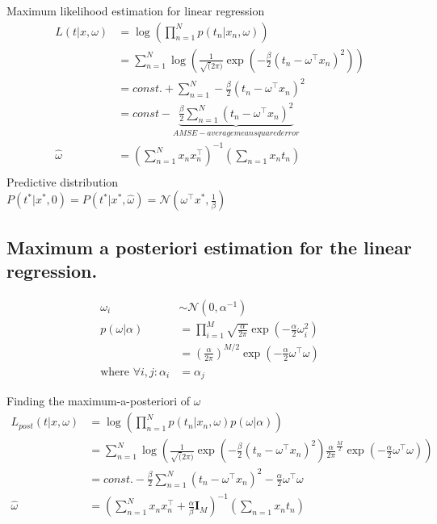 \begin{bbbox}{Maximum likelihood estimation for linear regression}
	\begin{align*}
			L(t | x,\omega) &= \log \left( \prod_{n=1}^N p(t_n |  x_n, \omega ) \right) \\
			        &= \sum_{n=1}^N \log \left( \frac{1}{\sqrt(2\pi)} \exp \left( - \frac{\beta}{2} \left( t_n - 	\omega^{\top} x_n \right)^2 \right) \right) \\
			        &= const. + \sum_{n=1}^N - \frac{\beta}{2} \left( t_n - \omega^{\top} x_n \right)^2 \\
			        &= const - \underbrace{\frac{\beta}{2} \sum_{n=1}^N \left( t_n - \omega^{\top} x_n \right)^2}_{AMSE - average mean squared error} \\
	   \hat{\omega} &= \left( \sum_{n=1}^N x_n x_n^{\top} \right)^{-1} \left( \sum_{n=1} x_n t_n \right) \\			 	    \end{align*}
	Predictive distribution \\
	$P(t^{*} | x^{*},0) = P(t^{*} | x^{*},\hat{\omega}) = \mathcal{N}(\omega^{\top} x^{*}, \frac{1}{\beta})$ 
\end{bbbox}

\subsection{Maximum a posteriori estimation for the linear regression.}
\begin{align}
\omega_i &\sim \mathcal{N}(0,\alpha^{-1})\\
p(\omega| \alpha) &= \prod_{i=1}^M  \sqrt{\frac{\alpha}{{2\pi}}}\exp\left( -\frac{\alpha}{2}  {\omega_i^2}\right)\\
&%
 =\left(\frac{\alpha}{2\pi}\right)^{M/2} \exp \left(-\frac{\alpha}{2} \omega^\top \omega  \right) \\
 \text{where } \forall i,j: \alpha_i &= \alpha_j
\end{align}

\begin{bbbox}{Finding the maximum-a-posteriori of $\omega$}
	\begin{align*}
		L_{post}(t | x,\omega) &= \log \left( \prod_{n=1}^N p(t_n |  x_n, \omega ) p(\omega|\alpha)\right) \\
		 &= \sum_{n=1}^N \log \left( \frac{1}{\sqrt(2\pi)} \exp \left( - \frac{\beta}{2} \left( t_n - 	\omega^{\top} x_n \right)^2 \right) \frac{\alpha}{2\pi}^{\frac{M}{2}} \exp \left( -\frac{\alpha}{2} \omega^{\top}\omega \right) \right) \\
		 &= const. - \frac{\beta}{2} \sum_{n=1}^N \left( t_n - \omega^{\top} x_n \right)^2 -\frac{\alpha}{2} \omega^{\top}\omega \\
	\hat{\omega} &= \left( \sum_{n=1}^N x_n x_n^{\top} + \frac{\alpha}{\beta} \mathbf{I}_M \right)^{-1} \left( \sum_{n=1} x_n t_n \right) \\			 
	\end{align*}
\end{bbbox}


